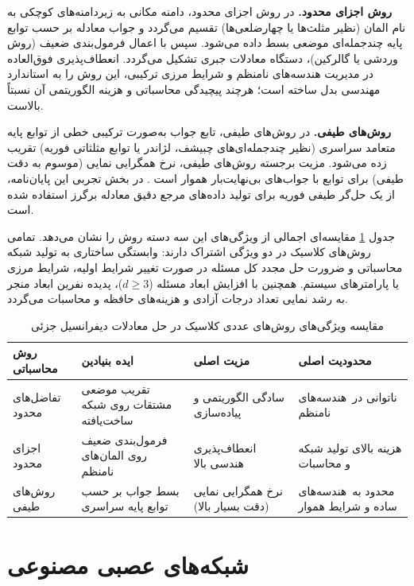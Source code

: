 \textbf{روش اجزای محدود.} در روش اجزای محدود، دامنه مکانی به زیردامنه‌های کوچکی به نام المان (نظیر مثلث‌ها یا چهارضلعی‌ها) تقسیم می‌گردد و جواب معادله بر حسب توابع پایه چندجمله‌ای موضعی بسط داده می‌شود. سپس با اعمال فرمول‌بندی ضعیف (روش وردشی یا گالرکین)، دستگاه معادلات جبری تشکیل می‌گردد. انعطاف‌پذیری فوق‌العاده در مدیریت هندسه‌های نامنظم و شرایط مرزی ترکیبی، این روش را به استاندارد مهندسی بدل ساخته است؛ هرچند پیچیدگی محاسباتی و هزینه الگوریتمی آن نسبتاً بالاست.

\textbf{روش‌های طیفی.} در روش‌های طیفی، تابع جواب به‌صورت ترکیبی خطی از توابع پایه متعامد سراسری (نظیر چندجمله‌ای‌های چبیشف، لژاندر یا توابع مثلثاتی فوریه) تقریب زده می‌شود. مزیت برجسته روش‌های طیفی، نرخ همگرایی نمایی (موسوم به دقت طیفی) برای توابع با جواب‌های بی‌نهایت‌بار هموار است \cite{trefethen2000}. در بخش تجربی این پایان‌نامه، از یک حل‌گر طیفی فوریه برای تولید داده‌های مرجع دقیق معادله برگرز استفاده شده است.

جدول \ref{tab:numerical} مقایسه‌ای اجمالی از ویژگی‌های این سه دسته روش را نشان می‌دهد. تمامی روش‌های کلاسیک در دو ویژگی اشتراک دارند: وابستگی ساختاری به تولید شبکه محاسباتی و ضرورت حل مجدد کل مسئله در صورت تغییر شرایط اولیه، شرایط مرزی یا پارامترهای سیستم. همچنین با افزایش ابعاد مسئله ($d \ge 3$)، پدیده نفرین ابعاد منجر به رشد نمایی تعداد درجات آزادی و هزینه‌های حافظه و محاسبات می‌گردد.

\begin{table}[t]
\caption{مقایسه ویژگی‌های روش‌های عددی کلاسیک در حل معادلات دیفرانسیل جزئی}
\label{tab:numerical}
\centering
\singlespacing
\begin{tabular}{|p{2.2cm}|p{3.3cm}|p{3.2cm}|p{3.9cm}|}
\hline
\textbf{روش محاسباتی} & \textbf{ایده بنیادین} & \textbf{مزیت اصلی} & \textbf{محدودیت اصلی} \\
\hline
تفاضل‌های محدود & تقریب موضعی مشتقات روی شبکه ساخت‌یافته & سادگی الگوریتمی و پیاده‌سازی & ناتوانی در~هندسه‌های نامنظم \\
\hline
اجزای محدود & فرمول‌بندی ضعیف روی المان‌های نامنظم & انعطاف‌پذیری هندسی بالا & هزینه بالای تولید شبکه و محاسبات \\
\hline
روش‌های طیفی & بسط جواب بر حسب توابع پایه سراسری & نرخ همگرایی نمایی (دقت بسیار بالا) & محدود به~هندسه‌های ساده و شرایط هموار \\
\hline
\end{tabular}
\end{table}

\section{شبکه‌های عصبی مصنوعی}
\label{sec:ann}

